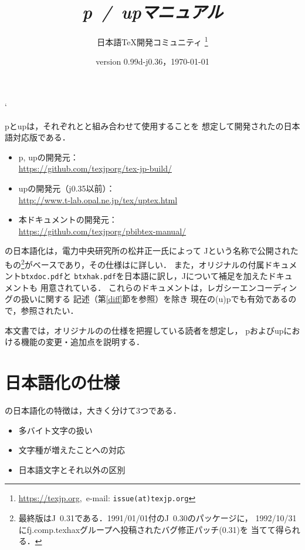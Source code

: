 \documentclass[a4paper,11pt,nomag,dvipdfmx]{jsarticle}
\def\file#1{\texttt{#1}}
\def\JBibTeX{\leavevmode\textcompwordmark\lower.5ex\hbox{J}\kern-.08em\BibTeX}
\def\pBibTeX{p\kern-.05em\BibTeX}
\def\upBibTeX{u\pBibTeX}
\def\JBibTeX{J\BibTeX}%
\def\pBibTeX{p\BibTeX}%
\def\upBibTeX{u\pBibTeX}%
\begin{document}
\catcode`
\title{\emph{\pBibTeX~/~\upBibTeX マニュアル}}
\author{日本語\TeX 開発コミュニティ\null
\thanks{\url{https://texjp.org},\ e-mail: \texttt{issue(at)texjp.org}}}
\date{version 0.99d-j0.36，\today}
\maketitle

\pBibTeX と\upBibTeX は，それぞれ\pTeX と\upTeX と組み合わせて使用することを
想定して開発された\BibTeX の日本語対応版である．
\begin{itemize}
  \item \pBibTeX, \upBibTeX の開発元：\\
    \url{https://github.com/texjporg/tex-jp-build/}
  \item \upBibTeX の開発元（j0.35以前）：\\
    \url{http://www.t-lab.opal.ne.jp/tex/uptex.html}
  \item 本ドキュメントの開発元：\\
    \url{https://github.com/texjporg/pbibtex-manual/}
\end{itemize}

\BibTeX の日本語化は，電力中央研究所の松井正一氏によって
\JBibTeX という名称で公開されたもの\footnote{%
最終版は\JBibTeX~0.31である．1991/01/01付の\JBibTeX~0.30のパッケージに，
1992/10/31にfj.comp.texhaxグループへ投稿されたバグ修正パッチ(0.31)を
当てて得られる．}がベースであり，その仕様は\cite{jbibtex}に詳しい．
また，オリジナルの\BibTeX 付属ドキュメント\file{btxdoc.pdf}と
\file{btxhak.pdf}を日本語に訳し，\JBibTeX について補足を加えたドキュメントも
用意されている\cite{jbtxdoc,jbtxhak}．
これらのドキュメントは，レガシーエンコーディングの扱いに関する
記述（第\ref{diff}節を参照）を除き
現在の(u)\pBibTeX でも有効であるので，参照されたい．

本文書では，オリジナルの\BibTeX の仕様を把握している読者を想定し，
\pBibTeX および\upBibTeX における機能の変更・追加点を説明する．

\clearpage
\tableofcontents
\clearpage

\section{日本語化の仕様}

\BibTeX の日本語化の特徴は，大きく分けて3つである．
\begin{itemize}
 \item 多バイト文字の扱い
 \item 文字種が増えたことへの対応
 \item 日本語文字とそれ以外の区別
\end{itemize}
\end{document}
